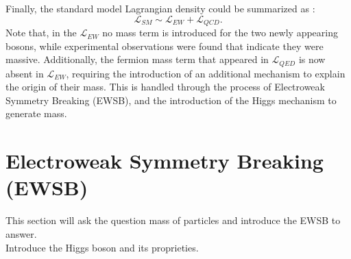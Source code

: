 Finally, the standard model Lagrangian density could be summarized as : 
\begin{equation}
    \mathcal{L}_{SM} \sim \mathcal{L}_{EW} + \mathcal{L}_{QCD}.
\end{equation}
Note that, in the $\mathcal{L}_{EW}$ no mass term is introduced for the two newly appearing bosons, while experimental observations were found that indicate they were massive. Additionally, the fermion mass term that appeared in $\mathcal{L}_{QED}$ is now absent in $\mathcal{L}_{EW}$, requiring the introduction of an additional mechanism to explain the origin of their mass. This is handled through the process of Electroweak Symmetry Breaking (EWSB), and the introduction of the Higgs mechanism to generate mass.

\section{Electroweak Symmetry Breaking (EWSB)}
\label{chap1:EWSB}
This section will ask the question mass of particles and introduce the EWSB to answer.\\
Introduce the Higgs boson and its proprieties.\\


